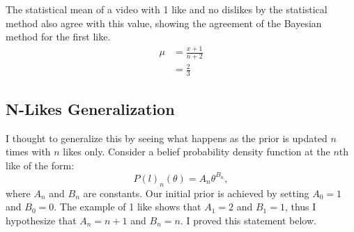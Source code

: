 \documentclass[a4paper,11pt]{article}
\begin{document}
The statistical mean of a video with 1 like and no dislikes by the statistical method also agree with this value, showing the agreement of the Bayesian method for the first like.
\begin{align*}
    \mu &= \frac{x+1}{n+2}\\
        &= \frac{2}{3}
\end{align*}

\subsection{N-Likes Generalization}
I thought to generalize this by seeing what happens as the prior is updated $n$ times with $n$ likes only. Consider a belief probability density function at the $n$th like of the form:
\[
    P(l)_n(\theta) = A_n \theta^{B_n},
\]
where $A_n$ and $B_n$ are constants. Our initial prior is achieved by setting $A_0=1$ and $B_0=0$. The example of 1 like shows that $A_1 = 2$ and $B_1 = 1$, thus I hypothesize that $A_n = n+1$ and $B_n = n$. I proved this statement below.
\end{document}

